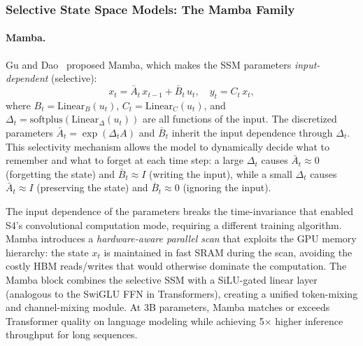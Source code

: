 \subsubsection{Selective State Space Models: The Mamba Family}
\label{subsubsec:mamba}

\paragraph{Mamba.}
Gu and Dao~\cite{gu2024mamba} proposed Mamba, which makes the SSM parameters \emph{input-dependent} (selective):
\begin{equation}
x_t = \bar{A}_t\, x_{t-1} + \bar{B}_t\, u_t, \quad y_t = C_t\, x_t,
\label{eq:mamba}
\end{equation}
where $B_t = \text{Linear}_B(u_t)$, $C_t = \text{Linear}_C(u_t)$, and $\Delta_t = \text{softplus}(\text{Linear}_\Delta(u_t))$ are all functions of the input. The discretized parameters $\bar{A}_t = \exp(\Delta_t A)$ and $\bar{B}_t$ inherit the input dependence through $\Delta_t$. This selectivity mechanism allows the model to dynamically decide what to remember and what to forget at each time step: a large $\Delta_t$ causes $\bar{A}_t \approx 0$ (forgetting the state) and $\bar{B}_t \approx I$ (writing the input), while a small $\Delta_t$ causes $\bar{A}_t \approx I$ (preserving the state) and $\bar{B}_t \approx 0$ (ignoring the input).

The input dependence of the parameters breaks the time-invariance that enabled S4's convolutional computation mode, requiring a different training algorithm. Mamba introduces a \emph{hardware-aware parallel scan} that exploits the GPU memory hierarchy: the state $x_t$ is maintained in fast SRAM during the scan, avoiding the costly HBM reads/writes that would otherwise dominate the computation. The Mamba block combines the selective SSM with a SiLU-gated linear layer (analogous to the SwiGLU FFN in Transformers), creating a unified token-mixing and channel-mixing module. At 3B parameters, Mamba matches or exceeds Transformer quality on language modeling while achieving 5$\times$ higher inference throughput for long sequences.


